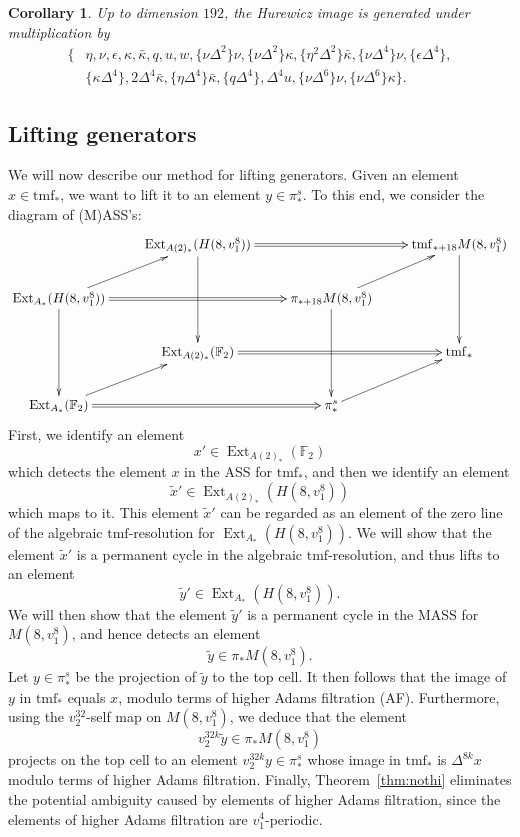 \documentclass[10pt]{amsart}
\newcommand{\td}[1]{\widetilde{#1}}
\newcommand{\FF}{\mathbb{F}}
\newcommand{\tmf}{\mathrm{tmf}}
\newtheorem{cor}[equation]{Corollary}
\theoremstyle{definition}
\numberwithin{equation}{section}
\numberwithin{figure}{section}
\DeclareMathOperator{\Ext}{Ext}
\begin{document}
\begin{cor}\label{Cor:Gens}
Up to dimension $192$, the Hurewicz image is generated under multiplication by 
\begin{align*}
\{ & \eta, \nu, \epsilon, \kappa, \bar{\kappa}, q, u, w, \{\nu \Delta^2 \} \nu, \{\nu \Delta^2 \} \kappa, \{\eta^2 \Delta^2 \} \bar{\kappa}, \{\nu \Delta^4 \} \nu, \{ \epsilon \Delta^4\}, \\
& \{ \kappa \Delta^4 \}, 2 \Delta^4 \bar{\kappa}, \{\eta \Delta^4 \} \bar{\kappa}, \{q \Delta^4\},  \Delta^4 u, \{\nu \Delta^6 \} \nu , \{ \nu \Delta^6 \} \kappa \}.
\end{align*}
\end{cor}

\subsection*{Lifting generators}

We will now describe our method for lifting generators.
Given an element $x \in \tmf_*$, we want to lift it to an element $y \in \pi_*^s$.  To this end, we consider the diagram of (M)ASS's:
$$
\xymatrix{
& \Ext_{A(2)_*}(H(8,v_1^8)) \ar@{=>}[rr] \ar[dd]
&& \tmf_{*+18}M(8,v_1^8) \ar[dd] \\
\Ext_{A_*}(H(8,v_1^8)) \ar@{=>}[rr] \ar[ru] \ar[dd]  
&& \pi_{*+18} M(8,v_1^8) \ar[ru] \ar[dd] & \\
& \Ext_{A(2)_*}(\FF_2) \ar@{=>}[rr] 
&& \tmf_* \\
\Ext_{A_*}(\FF_2) \ar@{=>}[rr] \ar[ru]
&& \pi_*^s \ar[ru]
}
$$ 
First, we identify an element
$$ x' \in \Ext_{A(2)_*}(\FF_2) $$
which detects the element $x$ in the ASS for $\tmf_*$, and then we identify an element 
$$ \td{x}' \in \Ext_{A(2)_*}(H(8,v_1^8)) $$
which maps to it.  This element $\td{x}'$ can be regarded as an element of the zero line of the algebraic $\tmf$-resolution for $\Ext_{A_*}(H(8,v_1^8))$.  We will show that the element $\td{x}'$ is a permanent cycle in the algebraic $\tmf$-resolution, and thus lifts to an element
$$ \td{y}' \in \Ext_{A_*}(H(8,v_1^8)). $$
We will then show that the element $\td{y}'$ is a permanent cycle in the MASS for $M(8,v_1^8)$, and hence detects an element
$$ \td{y} \in \pi_*M(8,v_1^8). $$
Let $y \in \pi^s_*$ be the projection of $\td{y}$ to the top cell. 
It then follows that the image of $y$ in $\tmf_*$ equals $x$, modulo terms of higher Adams filtration (AF).  Furthermore, using the $v_2^{32}$-self map on $M(8,v_1^8)$, we deduce that the element
$$ v_2^{32k}\td{y} \in \pi_*M(8,v_1^8) $$
projects on the top cell to an element $v_2^{32k}y \in \pi_*^s$ whose image in $\tmf_*$ is $\Delta^{8k}x$ modulo terms of higher Adams filtration.  Finally, Theorem~\ref{thm:nothi} eliminates the potential ambiguity caused by elements of higher Adams filtration, since the elements of higher Adams filtration are $v_1^4$-periodic.
\end{document}
